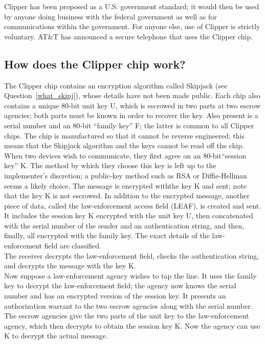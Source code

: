 Clipper has been proposed as a U.S. government standard; it would then
be used by anyone doing business with the federal government as well as
for communications within the government. For anyone else, use of
Clipper is strictly voluntary. AT\&T has announced a secure telephone
that uses the Clipper chip.

\subsection{How does the Clipper chip work?}

The Clipper chip contains an encryption algorithm called Skipjack (see
Question~\ref{what_skipj}), whose details have not been made public. Each
chip also contains a unique 80-bit unit key U, which is escrowed in two
parts at two escrow agencies; both parts must be known in order to recover
the key. Also present is a serial number and an 80-bit ``family key'' F;
the latter is common to all Clipper chips. The chip is manufactured so that
it cannot be reverse engineered; this means that the Skipjack algorithm and
the keys cannot be read off the chip.\\

When two devices wish to communicate, they first agree on an
80-bit``session key'' K. The method by which they choose this key is
left up to the implementer's discretion; a public-key method such as
RSA or Diffie-Hellman seems a likely choice. The message is encrypted
withthe key K and sent; note that the key K is not escrowed. In
addition to the encrypted message, another piece of data, called the
law-enforcement access field (LEAF), is created and sent. It includes
the session key K encrypted with the unit key U, then concatenated with
the serial number of the sender and an authentication string, and then,
finally, all encrypted with the family key. The exact details of the
law-enforcement field are classified.\\

The receiver decrypts the law-enforcement field, checks the
authentication string, and decrypts the message with the key K.\\

Now suppose a law-enforcement agency wishes to tap the line. It uses
the family key to decrypt the law-enforcement field; the agency now
knows the serial number and has an encrypted version of the session
key. It presents an authorization warrant to the two escrow agencies
along with the serial number. The escrow agencies give the two parts of
the unit key to the law-enforcement agency, which then decrypts to
obtain the session key K. Now the agency can use K to decrypt the
actual message.\\

